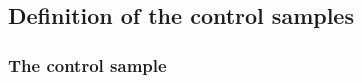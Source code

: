 %
%
%
\subsection{Definition of the control samples\label{sec:def-control-samples}}



\subsubsection{The \texorpdfstring{\mj}{muon plus jets} control sample\label{sec:muonSelection}}

